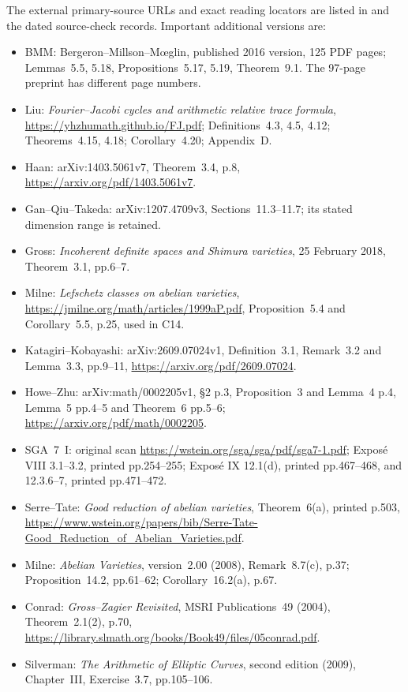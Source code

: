 \documentclass[11pt]{article}
\theoremstyle{definition}\newtheorem{definition}[theorem]{Definition}\newtheorem{remark}[theorem]{Remark}
\begin{document}
The external primary-source URLs and exact reading locators are
listed in  and the
dated source-check records. Important additional versions are:
\begin{itemize}[leftmargin=*]
\item BMM: Bergeron--Millson--M\oe glin, published 2016 version,
125 PDF pages; Lemmas~5.5, 5.18, Propositions~5.17, 5.19,
Theorem~9.1. The 97-page preprint has different page numbers.
\item Liu: \emph{Fourier--Jacobi cycles and arithmetic relative
trace formula}, \url{https://yhzhumath.github.io/FJ.pdf};
Definitions~4.3, 4.5, 4.12; Theorems~4.15, 4.18;
Corollary~4.20; Appendix~D.
\item Haan: arXiv:1403.5061v7, Theorem~3.4, p.8,
\url{https://arxiv.org/pdf/1403.5061v7}.
\item Gan--Qiu--Takeda: arXiv:1207.4709v3,
Sections~11.3--11.7; its stated dimension range is retained.
\item Gross: \emph{Incoherent definite spaces and Shimura varieties},
25 February 2018, Theorem~3.1, pp.6--7.
\item Milne: \emph{Lefschetz classes on abelian varieties},
\url{https://jmilne.org/math/articles/1999aP.pdf},
Proposition~5.4 and Corollary~5.5, p.25, used in C14.
\item Katagiri--Kobayashi: arXiv:2609.07024v1,
Definition~3.1, Remark~3.2 and Lemma~3.3, pp.9--11,
\url{https://arxiv.org/pdf/2609.07024}.
\item Howe--Zhu: arXiv:math/0002205v1,
\S2 p.3, Proposition~3 and Lemma~4 p.4,
Lemma~5 pp.4--5 and Theorem~6 pp.5--6;
\url{https://arxiv.org/pdf/math/0002205}.
\item SGA~7~I: original scan
\url{https://wstein.org/sga/sga/pdf/sga7-1.pdf};
Expos\'e VIII 3.1--3.2, printed pp.254--255;
Expos\'e IX 12.1(d), printed pp.467--468, and
12.3.6--7, printed pp.471--472.
\item Serre--Tate: \emph{Good reduction of abelian varieties},
Theorem~6(a), printed p.503,
\url{https://www.wstein.org/papers/bib/Serre-Tate-Good_Reduction_of_Abelian_Varieties.pdf}.
\item Milne: \emph{Abelian Varieties}, version~2.00 (2008),
Remark~8.7(c), p.37; Proposition~14.2, pp.61--62;
Corollary~16.2(a), p.67.
\item Conrad: \emph{Gross--Zagier Revisited}, MSRI
Publications~49 (2004), Theorem~2.1(2), p.70,
\url{https://library.slmath.org/books/Book49/files/05conrad.pdf}.
\item Silverman: \emph{The Arithmetic of Elliptic Curves},
second edition (2009), Chapter~III, Exercise~3.7,
pp.105--106.
\end{itemize}
\end{document}
